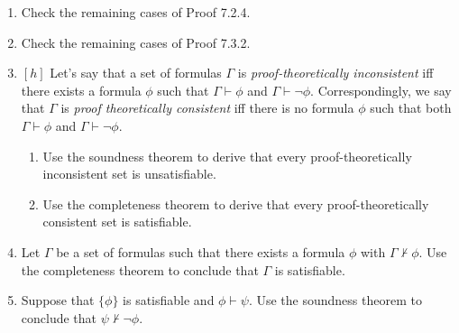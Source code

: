 	\begin{enumerate}[\thesection.1]
	
		\item Check the remaining cases of Proof 7.2.4.
		
		\item Check the remaining cases of Proof 7.3.2.
	
		\item $[h]$ Let's say that a set of formulas $\Gamma$ is \emph{proof-theoretically inconsistent} iff there exists a formula $\phi$ such that $\Gamma\vdash\phi$ and $\Gamma\vdash\neg\phi$. Correspondingly, we say that $\Gamma$ is \emph{proof theoretically consistent} iff there is no formula $\phi$ such that both $\Gamma\vdash\phi$ and $\Gamma\vdash\neg\phi$. 
		
		\begin{enumerate}
		
		\item Use the soundness theorem to derive that every proof-theoretically inconsistent set is unsatisfiable.
		
		\item Use the completeness theorem to derive that every proof-theoretically consistent set is satisfiable.
		
		\end{enumerate}
		
		\item Let $\Gamma$ be a set of formulas such that there exists a formula $\phi$ with $\Gamma\nvdash\phi$. Use the completeness theorem to conclude that $\Gamma$ is satisfiable.
		
		
		\item Suppose that $\{\phi\}$ is satisfiable and $\phi\vdash\psi$. Use the soundness theorem to conclude that $\psi\nvdash\neg\phi$.
						
	\end{enumerate}

\vfill

\hfill {}

